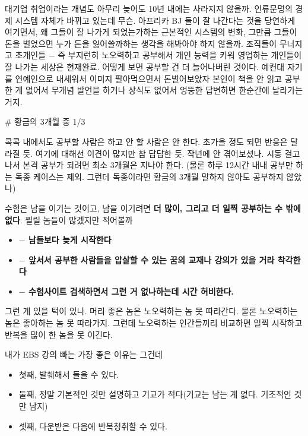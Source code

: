 대기업 취업이라는 개념도 아무리 늦어도 10년 내에는 사라지지 않을까. 인류문명의 경제 시스템 자체가 바뀌고 있는데 무슨.
아프리카 BJ 들이 잘 나간다는 것을 당연하게 여기면서, 왜 그들이 잘 나가게 되었는가하는 근본적인 시스템의 변화,
그만큼 그들이 돈을 벌었으면 누가 돈을 잃어쓸까하는 생각을 해봐아야 하지 않을까.
조직들이 무너지고 초개인들 $-$ 즉 부지런히 노오력하고 공부해서 개인 능력을 키워 영업하는 개인들이 잘 나가는 세상은 현재완료.
어떻게 보면 공부할 건 더 늘어나버린 것이다.
예컨대 자기를 연예인으로 내세워서 이미지 팔아먹으면서 돈벌어보았자
본인이 책을 안 읽고 공부한 게 없어서 무개념 발언을 하거나 상식도 없어서 엉뚱한 답변하면 한순간에 날라가는 거지.
\vspace{5mm}

$\#$ 황금의 3개월 중 1/3
\vspace{5mm}

콕콕 내에서도 공부할 사람은 하고 안 할 사람은 안 한다.
초가을 정도 되면 반응은 달라질 듯.
여기에 대해선 이견이 많지만 참 답답한 듯. 작년에 안 겪어보셨나.
시동 걸고나서 본격 공부가 되려면 최소 3개월은 지나야 한다.
(물론 하루 12시간 내내 공부만 하는 독종 케이스는 제외. 그런데 독종이라면 황금의 3개월 말하지 않아도 공부하지 않았나)
\vspace{5mm}

수험은 남을 이기는 것이고, 남을 이기려면 \textbf{더 많이, 그리고 더 일찍 공부하는 수 밖에 없다}.
찔릴 놈들이 많겠지만 적어볼까
\vspace{5mm}
\begin{itemize}
    \item[] \textbf{$-$ 남들보다 늦게 시작한다}
    \item[] \textbf{$-$ 앞서서 공부한 사람들을 압살할 수 있는 꿈의 교재나 강의가 있을 거라 착각한다}
    \item[] \textbf{$-$ 수험사이트 검색하면서 그런 거 없나하는데 시간 허비한다.}
\end{itemize}
\vspace{5mm}

그런 게 있을 턱이 있나.
머리 좋은 놈은 노오력하는 놈 못 따라간다. 물론 노오력하는 놈은 좋아하는 놈 못 따라가지.
그런데 노오력하는 인간들끼리 비교하면 일찍 시작하고 반복을 많이 한 놈을 못 이긴다.
\vspace{5mm}

내가 EBS 강의 빠는 가장 좋은 이유는 그건데
\begin{itemize}
    \item 첫째, 발췌해서 들을 수 있다.
    \item 둘째, 정말 기본적인 것만 설명하고 기교가 적다(기교는 남는 게 없다. 기초적인 것만 남지)
    \item 셋째, 다운받은 다음에 반복청취할 수 있다.
\end{itemize}
\vspace{5mm}

